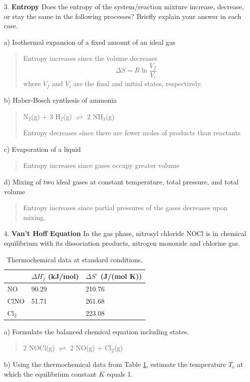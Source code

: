 \documentclass[11pt]{article}
\newcommand{\brian}[1]{
  {\begin{quote}
      \color{blue} #1
  \end{quote}}
}
\begin{document}
3. \textbf{Entropy} Does the entropy of the system/reaction mixture increase,
decrease, or stay the same in the following processes? Briefly explain your
answer in each case.

a) Isothermal expansion of a fixed amount of an ideal gas

\brian{Entropy increases since the volume decreases
  \begin{equation*}
    \Delta S = R\ln\frac{V_f}{V_i}
  \end{equation*}
  where $V_f$ and $V_i$ are the final and initial states, respectively.
}

b) Haber-Bosch synthesis of ammonia

\brian{N$_2$(g) + 3 H$_2$(g) $\rightleftharpoons$ 2 NH$_3$(g)

  Entropy decreases since there are fewer moles of products than reactants
}

c) Evaporation of a liquid

\brian{Entropy increases since gases occupy greater volume}

d) Mixing of two ideal gases at constant temperature, total pressure, and total volume

\brian{Entropy increases since partial pressures of the gases decreases upon mixing.}

4. \textbf{Van't Hoff Equation} In the gas phase, nitrosyl chloride NOCl is in chemical
equilibrium with its dissociation products, nitrogen monoxide and chlorine gas.

\begin{table}[hbpt]
  \centering
  \begin{tabular}{lll}
      & $\Delta H^\circ_f$ (kJ/mol) & $\Delta S^\circ$ (J/(mol K)) \\
      \hline
      NO     & 90.29 & 210.76 \\
      ClNO   & 51.71 & 261.68 \\
      Cl$_2$ &       & 223.08
  \end{tabular}
  \caption{Thermochemical data at standard conditions.}
  \label{tab:therm}
\end{table}

a) Formulate the balanced chemical equation including states.

\brian{2 NOCl(g) $\rightleftharpoons$ 2 NO(g) + Cl$_2$(g)}

b) Using the thermochemical data from Table \ref{tab:therm}, estimate the temperature $T_c$
at which the equilibrium constant $K$ equals 1.
\end{document}
